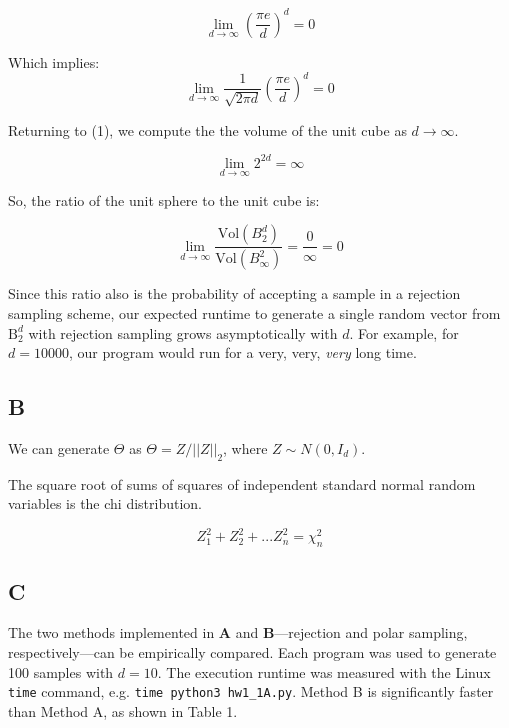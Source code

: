 \documentclass{article}
\begin{document}
\begin{equation}
\lim_{d \to \infty} \left( \frac{\pi e}{d} \right)^d = 0
\end{equation}

Which implies:
\begin{equation}
\lim_{d \to \infty} \frac{1}{\sqrt{2\pi d}} \left( \frac{\pi e}{d} \right)^d = 0
\end{equation}

Returning to (1), we compute the the volume of the unit cube as $d \to \infty$.

\begin{equation}
\lim_{d \to \infty} 2^{2d} = \infty
\end{equation}

So, the ratio of the unit sphere to the unit cube is:

\begin{equation}
\lim_{d \to \infty} \frac{\mathrm{Vol}(B^d_2)}{\mathrm{Vol}(B^2_\infty)} =
\frac{0}{\infty} = 0
\end{equation}

Since this ratio also is the probability of accepting a sample in a rejection sampling
scheme, our expected runtime to generate a single random vector from $\mathrm{B}^d_2$ with
rejection sampling grows asymptotically with $d$. For example, for $d=10000$, our
program would run for a very, very, \textit{very} long time. 

\subsection*{B}
We can generate $\Theta$ as $\Theta = Z / ||Z||_2$, where $Z \sim N(0, I_d)$.

\smallskip

The square root of sums of squares of independent standard normal random
variables is the chi distribution. 

\begin{equation}
	Z^2_1 + Z^2_2 + ... Z^2_n = \chi^2_n
\end{equation}

\subsection*{C}

The two methods implemented in \textbf{A} and \textbf{B}---rejection and polar
sampling, respectively---can be empirically
compared. Each program was used to generate 100 samples with $d=10$. The
execution runtime was measured with the Linux \texttt{time} command, e.g.
\texttt{time python3 hw1\_1A.py}. Method B is significantly faster than Method
A, as shown in Table 1.
\end{document}
